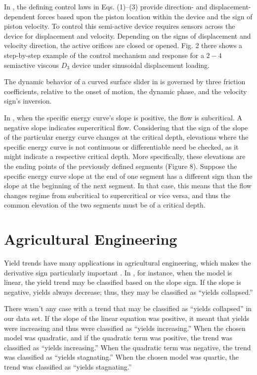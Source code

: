 \documentclass[11pt]{book}
\begin{document}
In \cite{hazaveh2017experimental}, the defining control laws in Eqs.
(1)--(3) provide direction- and displacement-dependent forces based
upon the piston location within the device and the sign of piston
velocity. To control this semi-active device requires sensors across
the device for displacement and velocity. Depending on the signs of
displacement and velocity direction, the active orifices are closed
or opened. Fig. 2 there shows a step-by-step example of the control
mechanism and response for a $2-4$ semiactive viscous $D_{3}$ device
under sinusoidal displacement loading.

The dynamic behavior of a curved surface slider in \cite{saitta2018base}
is governed by three friction coefficients, relative to the onset
of motion, the dynamic phase, and the velocity sign's inversion.

In \cite{petikas2020calculation}, when the specific energy curve's
slope is positive, the flow is subcritical. A negative slope indicates
supercritical flow. Considering that the sign of the slope of the
particular energy curve changes at the critical depth, elevations
where the specific energy curve is not continuous or differentiable
need be checked, as it might indicate a respective critical depth.
More specifically, these elevations are the ending points of the previously
defined segments (Figure 8). Suppose the specific energy curve slope
at the end of one segment has a different sign than the slope at the
beginning of the next segment. In that case, this means that the flow
changes regime from subcritical to supercritical or vice versa, and
thus the common elevation of the two segments must be of a critical
depth.


\section{Agricultural Engineering}
Yield trends have many applications in agricultural engineering, which makes the derivative sign particularly important . In \cite{zymaroieva2020spatial}, for instance, when the model is linear, the yield trend may be classified based on the slope sign. If the slope is negative, yields always decrease; thus, they may be classified as ``yields collapsed.'' 

There wasn't any case with a trend that may be classified as ``yields collapsed'' in our data set. If the slope of the linear equation was positive, it meant that yields were increasing and thus were classified  as ``yields increasing.'' When the chosen model was quadratic, and if the quadratic term was positive, the trend was classified as ``yields increasing.'' When the quadratic term was negative, the trend was classified as ``yields stagnating.'' When the chosen model was quartic, the trend was classified as ``yields stagnating.'' 
	
\end{document}
